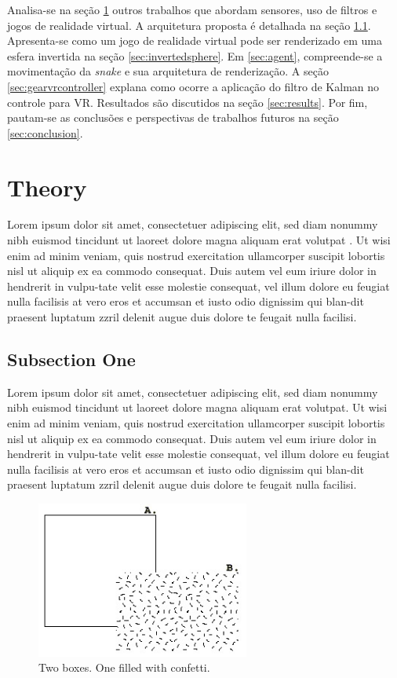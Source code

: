\documentclass{vgtc}                          %
\begin{document}
Analisa-se na seção \ref{sec:relatedworks} outros trabalhos que abordam sensores, uso de filtros e jogos de realidade virtual. A arquitetura proposta é detalhada na seção \ref{sec:architecture}. Apresenta-se como um jogo de realidade virtual pode ser renderizado em uma esfera invertida na seção \ref{sec:invertedsphere}. Em \ref{sec:agent}, compreende-se a movimentação da \textit{snake} e sua arquitetura de renderização. A seção \ref{sec:gearvrcontroller} explana como ocorre a aplicação do filtro de Kalman no controle para VR. Resultados são discutidos na seção \ref{sec:results}. Por fim, pautam-se as conclusões e perspectivas de trabalhos futuros na seção \ref{sec:conclusion}.

\section{Theory} \label{sec:relatedworks}

Lorem ipsum dolor sit amet, consectetuer adipiscing elit, sed diam nonummy nibh euismod tincidunt ut laoreet dolore magna aliquam erat volutpat \cite{Lorensen:1987:MCA} \cite{kindlmann:1999:SAG}. Ut wisi enim ad minim veniam, quis nostrud exercit­ation ullamcorper suscipit lobortis nisl ut aliquip ex ea commodo consequat. Duis autem vel eum iriure dolor in hendrerit in vulpu-tate velit esse molestie consequat, vel illum dolore eu feugiat nulla facilisis at vero eros et accumsan et iusto odio dignissim qui blan-dit praesent luptatum zzril delenit augue duis dolore te feugait nulla facilisi.

\subsection{Subsection One} \label{sec:architecture}

Lorem ipsum dolor sit amet, consectetuer adipiscing elit, sed diam nonummy nibh euismod tincidunt ut laoreet dolore magna aliquam erat volutpat. Ut wisi enim ad minim veniam, quis nostrud exercit­ation ullamcorper suscipit lobortis nisl ut aliquip ex ea commodo consequat. Duis autem vel eum iriure dolor in hendrerit in vulpu-tate velit esse molestie consequat, vel illum dolore eu feugiat nulla facilisis at vero eros et accumsan et iusto odio dignissim qui blan-dit praesent luptatum zzril delenit augue duis dolore te feugait nulla facilisi.

\begin{figure}[htb]
  \centering
  \includegraphics[width=2.76in]{figure.jpg}
  \caption{Two boxes. One filled with confetti.}
\end{figure}
\end{document}
